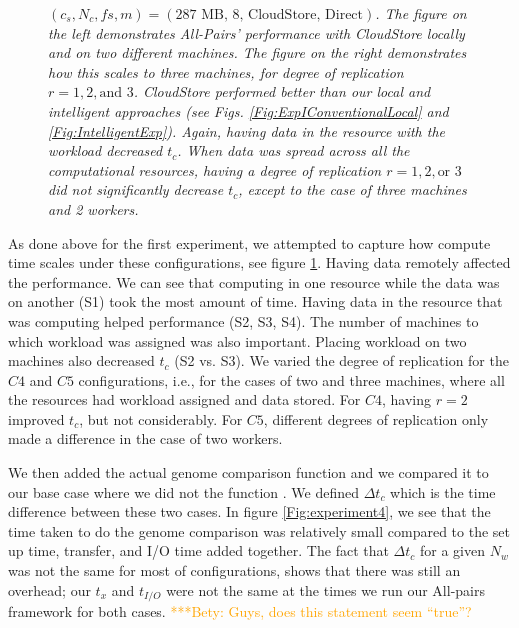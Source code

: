 \documentclass{rspublic}
\newcommand{\micnote}[1]{ {\textcolor{blue} { ***Michael: #1 }}}
\newcommand{\betynote}[1]{ {\textcolor{orange} { ***Bety: #1 }}}
\newcommand{\jhanote}[1]{} \newcommand{\micnote}[1]{}\newcommand{\betynote}[1]{} \newcommand{\fixme}[1]{}
\begin{document}
\begin{figure}
\begin{center}
{\label{Fig:experiment3:b}
}
\caption{\textit{$(c_s, N_c, fs, m) = (\mbox{287 MB, 8, CloudStore,
Direct})$. The figure on the left demonstrates All-Pairs' performance
with CloudStore locally and on two different machines. The figure on the
right demonstrates how this scales to three machines, for degree of
replication $r=1,2,\mbox{and } 3$. CloudStore performed better than our
local and intelligent approaches (see Figs.
\ref{Fig:ExpIConventionalLocal} and \ref{Fig:IntelligentExp}). Again,
having data in the resource with the workload decreased $t_c$. When data
was spread across all the computational resources, having a degree of
replication $r = 1, 2, \mbox{or } 3$ did not significantly decrease
$t_c$, except to the case of three machines and 2 workers.}}
\label{Fig:experiment3}
\end{center}
\end{figure}


As done above for the first experiment, we attempted to capture how
compute time scales under these configurations, see figure
\ref{Fig:experiment3}. Having data remotely affected the performance. We
can see that computing in one resource while the data was on another
(S1) took the most amount of time. Having data in the resource that was
computing helped performance (S2, S3, S4). The number of machines to
which workload was assigned was also important. Placing workload on two
machines also decreased $t_c$ (S2 vs. S3). We varied the degree of
replication for the $C4$ and $C5$ configurations, i.e., for the cases of
two and three machines, where all the resources had workload assigned
and data stored. For $C4$, having $r = 2$ improved $t_c$, but not
considerably. For $C5$, different degrees of replication only made a
difference in the case of two workers.

We then added the actual genome comparison function and we compared it
to our base case where we did not the function . We defined $\Delta t_c$
which is the time difference between these two cases. In figure
\ref{Fig:experiment4}, we see that the time taken to do the genome
comparison was relatively small compared to the set up time, transfer,
and I/O time added together. The fact that $\Delta t_c$ for a given
$N_w$ was not the same for most of configurations, shows that there was
still an overhead; our $t_x$ and $t_{I/O}$ were not the same at the
times we run our All-pairs framework for both cases. \betynote{Guys,
does this statement seem ``true''?}
\end{document}

